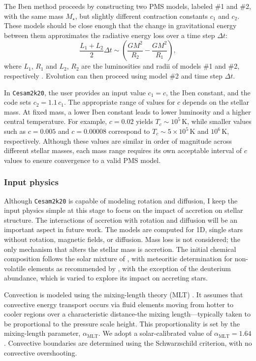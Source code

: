 \documentclass[12pt,a4paper]{article}
\newcommand{\mr}{\mathrm}
\begin{document}
The Iben method proceeds by constructing two PMS models, labeled \#1 and \#2, with the same mass $M_\star$, but slightly different contraction constants $c_1$ and $c_2$. These models should be close enough that the change in gravitational energy between them approximates the radiative energy loss over a time step $\Delta t$:
\begin{equation}
  \frac{L_1 + L_2}{2}\Delta t \sim \left(\frac{GM^2}{R_2} - \frac{GM^2}{R_1}\right),
\end{equation}
where $L_1$, $R_1$ and $L_2$, $R_2$ are the luminosities and radii of models \#1 and \#2, respectively \parencite[cf. Eq.~(13)][]{Morel1997}. Evolution can then proceed using model \#2 and time step $\Delta t$.

In \texttt{Cesam2k20}, the user provides an input value $c_1 = c$, the Iben constant, and the code sets $c_2 = 1.1\,c_1$. The appropriate range of values for $c$ depends on the stellar mass. At fixed mass, a lower Iben constant leads to lower luminosity and a higher central temperature. For example, $c = 0.02$ yields $T_c \sim 10^5\,\mr{K}$, while smaller values such as $c = 0.005$ and $c = 0.00008$ correspond to $T_c \sim 5 \times 10^5\,\mr{K}$ and $10^6\,\mr{K}$, respectively. Although these values are similar in order of magnitude across different stellar masses, each mass range requires its own acceptable interval of $c$ values to ensure convergence to a valid PMS model.


\subsubsection{Input physics}
\label{sec:cesam2k20_input_physics}

Although \texttt{Cesam2k20} is capable of modeling rotation and diffusion, I keep the input physics simple at this stage to focus on the impact of accretion on stellar structure. The interactions of accretion with rotation and diffusion will be an important aspect in future work. The models are computed for 1D, single stars without rotation, magnetic fields, or diffusion. Mass loss is not considered; the only mechanism that alters the stellar mass is accretion. The initial chemical composition follows the solar mixture of \textcite{AsplundEtAl2009}, with meteoritic determination for non-volatile elements as recommended by \textcite{SerenelliEtAl2009}, with the exception of the deuterium abundance, which is varied to explore its impact on accreting stars.

Convection is modeled using the mixing-length theory (MLT) \parencite{CoxGiuli1968a}. It assumes that convective energy transport occurs via fluid elements moving from hotter to cooler regions over a characteristic distance-the mixing length—typically taken to be proportional to the pressure scale height. This proportionality is set by the mixing-length parameter, $\alpha_\mr{MLT}$. We adopt a solar-calibrated value of $\alpha_\mr{MLT} = 1.64$. Convective boundaries are determined using the Schwarzschild criterion, with no convective overshooting.
\end{document}
